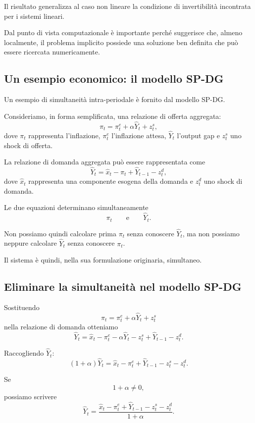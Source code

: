 \documentclass{book}
\begin{document}
Il risultato generalizza al caso non lineare la condizione di invertibilità
incontrata per i sistemi lineari.

Dal punto di vista computazionale è importante perché suggerisce che,
almeno localmente, il problema implicito possiede una soluzione ben
definita che può essere ricercata numericamente.


\subsection{Un esempio economico: il modello SP-DG}

Un esempio di simultaneità intra-periodale è fornito dal modello SP-DG.

Consideriamo, in forma semplificata, una relazione di offerta aggregata:
\[
\pi_t
=
\pi_t^e+\alpha\widehat{Y}_t+z_t^s,
\]
dove $\pi_t$ rappresenta l'inflazione, $\pi_t^e$ l'inflazione attesa,
$\widehat{Y}_t$ l'output gap e $z_t^s$ uno shock di offerta.

La relazione di domanda aggregata può essere rappresentata come
\[
\widehat{Y}_t
=
\widehat{x}_t-\pi_t+\widehat{Y}_{t-1}-z_t^d,
\]
dove $\widehat{x}_t$ rappresenta una componente esogena della domanda e
$z_t^d$ uno shock di domanda.

Le due equazioni determinano simultaneamente
\[
\pi_t
\qquad\text{e}\qquad
\widehat{Y}_t.
\]

Non possiamo quindi calcolare prima $\pi_t$ senza conoscere
$\widehat{Y}_t$, ma non possiamo neppure calcolare
$\widehat{Y}_t$ senza conoscere $\pi_t$.

Il sistema è quindi, nella sua formulazione originaria, simultaneo.


\subsection{Eliminare la simultaneità nel modello SP-DG}

Sostituendo
\[
\pi_t
=
\pi_t^e+\alpha\widehat{Y}_t+z_t^s
\]
nella relazione di domanda otteniamo
\[
\widehat{Y}_t
=
\widehat{x}_t
-
\pi_t^e
-
\alpha\widehat{Y}_t
-
z_t^s
+
\widehat{Y}_{t-1}
-
z_t^d.
\]

Raccogliendo $\widehat{Y}_t$:
\[
(1+\alpha)\widehat{Y}_t
=
\widehat{x}_t
-
\pi_t^e
+
\widehat{Y}_{t-1}
-
z_t^s
-
z_t^d.
\]

Se
\[
1+\alpha\neq0,
\]
possiamo scrivere
\[
\widehat{Y}_t
=
\frac{
\widehat{x}_t
-
\pi_t^e
+
\widehat{Y}_{t-1}
-
z_t^s
-
z_t^d
}
{1+\alpha}.
\]
\end{document}
